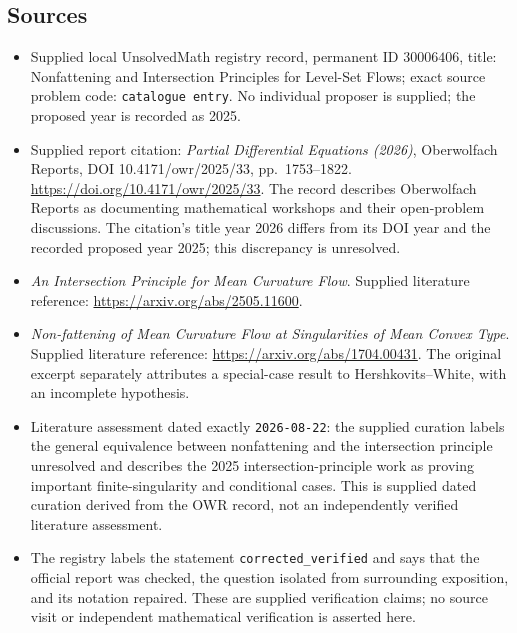 \documentclass[11pt]{article}
\begin{document}
\subsection{Sources}
\begin{itemize}
\item Supplied local UnsolvedMath registry record, permanent ID \(30006406\), title: Nonfattening and Intersection Principles for Level-Set Flows; exact source problem code: \texttt{catalogue entry}. No individual proposer is supplied; the proposed year is recorded as 2025.
\item Supplied report citation: \emph{Partial Differential Equations (2026)}, Oberwolfach Reports, DOI 10.4171/owr/2025/33, pp.\ 1753--1822. \url{https://doi.org/10.4171/owr/2025/33}. The record describes Oberwolfach Reports as documenting mathematical workshops and their open-problem discussions. The citation's title year 2026 differs from its DOI year and the recorded proposed year 2025; this discrepancy is unresolved.
\item \emph{An Intersection Principle for Mean Curvature Flow}. Supplied literature reference: \url{https://arxiv.org/abs/2505.11600}.
\item \emph{Non-fattening of Mean Curvature Flow at Singularities of Mean Convex Type}. Supplied literature reference: \url{https://arxiv.org/abs/1704.00431}. The original excerpt separately attributes a special-case result to Hershkovits--White, with an incomplete hypothesis.
\item Literature assessment dated exactly \texttt{2026-08-22}: the supplied curation labels the general equivalence between nonfattening and the intersection principle unresolved and describes the 2025 intersection-principle work as proving important finite-singularity and conditional cases. This is supplied dated curation derived from the OWR record, not an independently verified literature assessment.
\item The registry labels the statement \texttt{corrected\_verified} and says that the official report was checked, the question isolated from surrounding exposition, and its notation repaired. These are supplied verification claims; no source visit or independent mathematical verification is asserted here.
\end{itemize}
\end{document}
